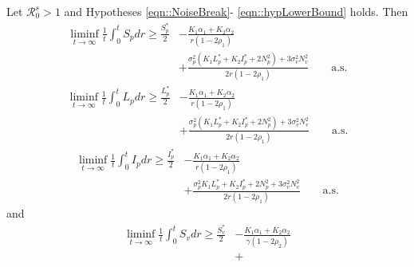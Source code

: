 %
\begin{theorem}
 	\label{thm::LowerBound}
 	Let $\mathcal{R}^s_0>1$ and Hypotheses \autoref{eqn::NoiseBreak}-
 	\autoref{eqn::hypLowerBound} holds. Then
 	\begin{equation}\label{eqn::lowerSuscPlant}
 		\begin{aligned}
			\liminf_{t \to \infty}
			\frac{1}{t}
			\int_0 ^ t S_p dr 
			\geq  
			\frac{S_p ^* }{2} 
			&-
			 	\frac{
			 		K_1 \alpha_1 + 
			 		K_2 \alpha_2
			 	}{ r (1 - 2 \rho_1)} 
			\\
			&+
				\frac{
			 		\sigma_p ^ 2 
			 		\left(
			 			K_1 L_p ^ * + 
			 			K_2 I_p ^* + 2N_p ^ 2
			 		\right) + 
			 		3 \sigma_v ^ 2 N_v^2
				}{2 r (1 - 2 \rho_1)}
				 \qquad \mbox{a.s.}
		\end{aligned}
	\end{equation}
%
	\begin{equation}\label{eqn::lowerLatenPlant}
	 	\begin{aligned}
	 		\liminf_{t\to \infty}
 				\frac{1}{t}
 				\int_0^t
 					L_p dr
 				\geq 
 				\frac{L_p^*}{2} 
 				&- 
 				\frac{K_1 \alpha_1 + 
 					K_2 \alpha_2}{ r(1 - 2 \rho_1)}
 				\\
	 		&+
 				\frac{\sigma_p ^ 2
 					\left(
 						K_1 L_p ^* + 
 						K_2 I_p ^* + 2N_p ^ 2
 					\right) + 
 					3 \sigma_v ^ 2 
 					N_v ^ 2}{2 r(1 - 2 \rho_1)}
 				 \qquad \mbox{a.s.}
 	\end{aligned}
 \end{equation}
%
 \begin{equation}\label{eqn::lowerInfecPlant}
 	\begin{aligned}
 		\liminf_{t\to \infty}
 			\frac{1}{t}
 			\int_0 ^ t I_p dr
 			\geq 
 			\frac{I_p ^ *}{2}
 			&- 
 			\frac{K_1 \alpha_1 + 
 				K_2\alpha_2}{r (1 - 2 \rho_1)}
 				\\
 		&+
	 			\frac{\sigma_p ^ 2
	 					K_1 L_p ^* + 
	 					K_2 I_p ^* + 
	 					2N_p ^ 2
	 				 + 
	 				3 \sigma_v^2 N_v^2}{2r(1 - 2 \rho_1)}
 			\qquad \mbox{a.s.}
 		\end{aligned}
 	\end{equation}
%
and
	\begin{equation}\label{eqn::lowerSuscVector}
		\begin{aligned}
				\liminf\limits_{t \to \infty}
				\frac{1}{t}
				\int_{0} ^ {t} S_v dr
			 	\geq
			 	\frac{S_v^*}{2} 
		 	&- 
			 	\frac{K_1 \alpha_1 + 
			 		K_2 \alpha_2}{\gamma(1 - 2 \rho_2)}
			 	\\
 			&+

\end{aligned}
\end{equation}
\end{theorem}
